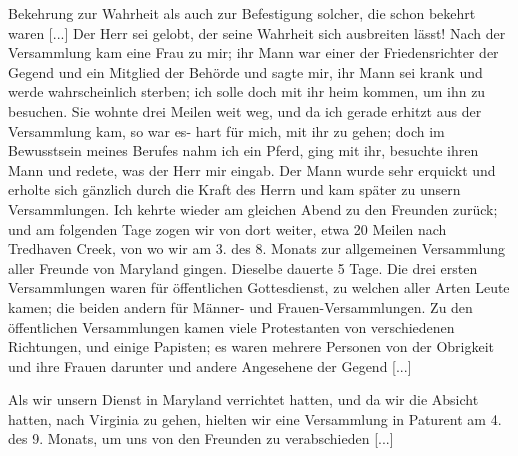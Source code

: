 Bekehrung zur Wahrheit als auch zur Befestigung solcher, die
schon bekehrt waren [...] Der Herr sei gelobt, der seine 
Wahrheit sich ausbreiten lässt! Nach der Versammlung kam eine Frau
zu mir; ihr Mann war einer der Friedensrichter der Gegend
und ein Mitglied der Behörde und sagte mir, ihr Mann
sei krank und werde wahrscheinlich sterben; ich solle doch mit ihr
heim kommen, um ihn zu besuchen. Sie wohnte drei Meilen weit
weg, und da ich gerade erhitzt aus der Versammlung kam, so war
es- hart für mich, mit ihr zu gehen; doch im Bewusstsein meines
Berufes nahm ich ein Pferd, ging mit ihr, besuchte ihren Mann
und redete, was der Herr mir eingab. Der Mann wurde sehr
erquickt und erholte sich gänzlich durch die Kraft des Herrn und
kam später zu unsern Versammlungen. Ich kehrte wieder am
gleichen Abend zu den Freunden zurück; und am folgenden Tage
zogen wir von dort weiter, etwa 20 Meilen nach Tredhaven
Creek, von wo wir am 3. des 8. Monats 
zur allgemeinen Versammlung aller Freunde von Maryland gingen. Dieselbe dauerte
5 Tage. Die drei ersten Versammlungen waren für öffentlichen
Gottesdienst, zu welchen 
aller Arten Leute kamen; die beiden
andern für Männer- und Frauen-Versammlungen. Zu den öffentlichen 
Versammlungen kamen viele Protestanten von verschiedenen
Richtungen, und einige Papisten; es waren mehrere Personen
von der Obrigkeit und ihre Frauen darunter und andere Angesehene 
der Gegend [...] 

Als wir unsern Dienst in Maryland verrichtet hatten, und
da wir die Absicht hatten, nach Virginia zu gehen, hielten wir
eine Versammlung in Paturent am 4. des 9. Monats, um uns
von den Freunden zu verabschieden [...]

